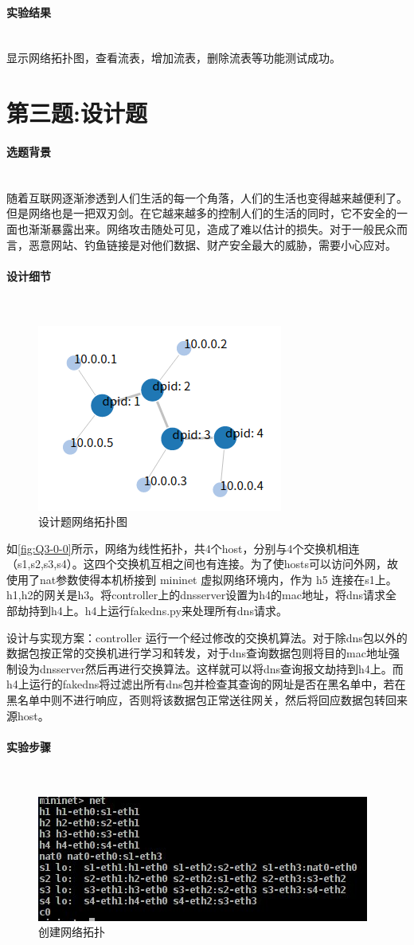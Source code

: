 \documentclass[format=draft,language=chinese,category=SDN]{hustreport}
\newcommand{\myparagraph}[1]{\paragraph{#1}\mbox{}\\}
\begin{document}
\myparagraph{实验结果}
显示网络拓扑图，查看流表，增加流表，删除流表等功能测试成功。

\clearpage

\section{第三题:设计题}\label{sec:Q3}

\myparagraph{选题背景}
随着互联网逐渐渗透到人们生活的每一个角落，人们的生活也变得越来越便利了。但是网络也是一把双刃剑。在它越来越多的控制人们的生活的同时，它不安全的一面也渐渐暴露出来。网络攻击随处可见，造成了难以估计的损失。对于一般民众而言，恶意网站、钓鱼链接是对他们数据、财产安全最大的威胁，需要小心应对。

\myparagraph{设计细节}
\begin{figure}[!h]
\centering
\includegraphics[width=.5\textwidth]{fig/3_0-0}
\caption{设计题网络拓扑图}\label{fig:Q3-0-0}
\end{figure}

如\autoref{fig:Q3-0-0}所示，网络为线性拓扑，共4个host，分别与4个交换机相连（s1,s2,s3,s4）。这四个交换机互相之间也有连接。为了使hosts可以访问外网，故使用了nat参数使得本机桥接到 mininet 虚拟网络环境内，作为 h5 连接在s1上。h1,h2的网关是h3。将controller上的dnsserver设置为h4的mac地址，将dns请求全部劫持到h4上。h4上运行fakedns.py来处理所有dns请求。

设计与实现方案：controller 运行一个经过修改的交换机算法。对于除dns包以外的数据包按正常的交换机进行学习和转发，对于dns查询数据包则将目的mac地址强制设为dnsserver然后再进行交换算法。这样就可以将dns查询报文劫持到h4上。而h4上运行的fakedns将过滤出所有dns包并检查其查询的网址是否在黑名单中，若在黑名单中则不进行响应，否则将该数据包正常送往网关，然后将回应数据包转回来源host。

\myparagraph{实验步骤}
\begin{figure}[!h]
\centering
\includegraphics[width=.5\textwidth]{fig/3_0}
\caption{创建网络拓扑}\label{fig:Q3-0}
\end{figure}
\end{document}

